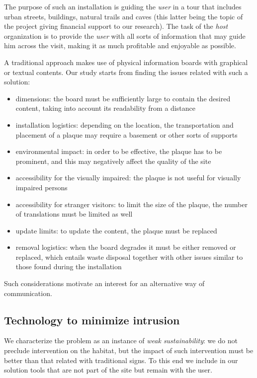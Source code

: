 \documentclass[sustainability,article,submit,pdftex,moreauthors]{Definitions/mdpi}
\begin{document}
The purpose of such an installation is guiding the {\em user} in a tour that includes urban streets, buildings, natural trails and caves (this latter being the topic of the project giving financial support to our research). The task of the {\em host} organization is to provide the {\em user} with all sorts of information that may guide him across the visit, making it as much profitable and enjoyable as possible.

A traditional approach makes use of physical information boards with graphical or textual contents. Our study starts from finding the issues related with such a solution:

\begin{itemize}
	\item dimensions: the board must be sufficiently large to contain the desired content, taking into account its readability from a distance
	\item installation logistics: depending on the location, the transportation and placement of a plaque may require a basement or other sorts of supports
	\item environmental impact: in order to be effective, the plaque has to be prominent, and this may negatively affect the quality of the site 
	\item accessibility for the visually impaired: the plaque is not useful for visually impaired persons
	\item accessibility for stranger visitors: to limit the size of the plaque, the number of translations must be limited as well
	\item update limits: to update the content, the plaque must be replaced
	\item removal logistics: when the board degrades it must be either removed or replaced, which entails waste disposal together with other issues similar to those found during the installation
\end{itemize}

Such considerations motivate an interest for an alternative way of communication.

\subsection{Technology to minimize intrusion}

We characterize the problem as an instance of {\em weak sustainability}: we do not preclude intervention on the habitat, but the impact of such intervention must be better than that related with traditional signs. To this end we include in our solution tools that are not part of the site but remain with the user.   
\end{document}
